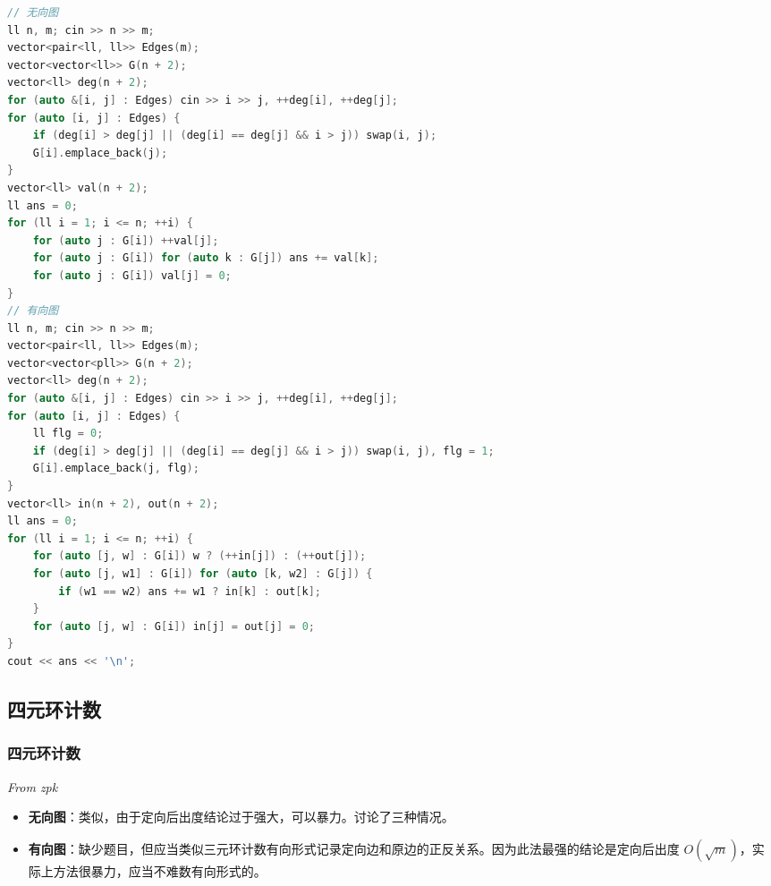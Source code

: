 \documentclass[10pt]{ctexart}
\providecommand{\tightlist}{\setlength{\itemsep}{0pt}\setlength{\parskip}{0pt}}
\begin{document}
\begin{multicols}{3}
\begin{lstlisting}[language={C++}]
// 无向图
ll n, m; cin >> n >> m;
vector<pair<ll, ll>> Edges(m);
vector<vector<ll>> G(n + 2);
vector<ll> deg(n + 2);
for (auto &[i, j] : Edges) cin >> i >> j, ++deg[i], ++deg[j];
for (auto [i, j] : Edges) {
    if (deg[i] > deg[j] || (deg[i] == deg[j] && i > j)) swap(i, j);
    G[i].emplace_back(j);
}
vector<ll> val(n + 2);
ll ans = 0;
for (ll i = 1; i <= n; ++i) {
    for (auto j : G[i]) ++val[j];
    for (auto j : G[i]) for (auto k : G[j]) ans += val[k];
    for (auto j : G[i]) val[j] = 0;
}
// 有向图
ll n, m; cin >> n >> m;
vector<pair<ll, ll>> Edges(m);
vector<vector<pll>> G(n + 2);
vector<ll> deg(n + 2);
for (auto &[i, j] : Edges) cin >> i >> j, ++deg[i], ++deg[j];
for (auto [i, j] : Edges) {
    ll flg = 0;
    if (deg[i] > deg[j] || (deg[i] == deg[j] && i > j)) swap(i, j), flg = 1;
    G[i].emplace_back(j, flg);
}
vector<ll> in(n + 2), out(n + 2);
ll ans = 0;
for (ll i = 1; i <= n; ++i) {
    for (auto [j, w] : G[i]) w ? (++in[j]) : (++out[j]);
    for (auto [j, w1] : G[i]) for (auto [k, w2] : G[j]) {
        if (w1 == w2) ans += w1 ? in[k] : out[k];
    }
    for (auto [j, w] : G[i]) in[j] = out[j] = 0;
}
cout << ans << '\n';
\end{lstlisting}

    \subsection{四元环计数}\label{ux56dbux5143ux73afux8ba1ux6570}

    \subsubsection{四元环计数}\label{ux56dbux5143ux73afux8ba1ux6570-1}

    \emph{From zpk}

    \begin{itemize}
    \tightlist
    \item
      \textbf{无向图}：类似，由于定向后出度结论过于强大，可以暴力。讨论了三种情况。
    \item
      \textbf{有向图}：缺少题目，但应当类似三元环计数有向形式记录定向边和原边的正反关系。因为此法最强的结论是定向后出度
      \(O(\sqrt{m})\)，实际上方法很暴力，应当不难数有向形式的。
    \end{itemize}


\end{multicols}
\end{document}
